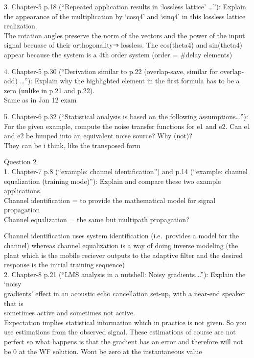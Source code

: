 \documentclass[
  a4paper,
  ,captions=tableheading
]{scrartcl}
\begin{document}
3. Chapter-5 p.18 (``Repeated application results in `lossless lattice'
\ldots''): Explain the appearance of the multiplication by `cosq4' and
`sinq4' in this lossless lattice realization.\\
The rotation angles preserve the norm of the vectors and the power of
the input signal becuase of their orthogonality⇒ lossless. The
cos(theta4) and sin(theta4) appear because the system is a 4th order
system (order = \#delay elements)

4. Chapter-5 p.30 (``Derivation similar to p.22 (overlap-save, similar
for overlap-add) \ldots''): Explain why the highlighted element in the
first formula has to be a zero (unlike in p.21 and p.22).\\
Same as in Jan 12 exam

5. Chapter-6 p.32 (``Statistical analysis is based on the following
assumptions\ldots''): For the given example, compute the noise transfer
functions for e1 and e2. Can e1 and e2 be lumped into an equivalent
noise source? Why (not)?\\
They can be i think, like the transposed form

Question 2\\
1. Chapter-7 p.8 (``example: channel identification'') and p.14
(``example: channel equalization (training mode)''): Explain and compare
these two example applications.\\
Channel identification = to provide the mathematical model for signal
propagation\\
Channel equalization = the same but multipath propagation?

Channel identification uses system identification (i.e.~provides a model
for the channel) whereas channel equalization is a way of doing inverse
modeling (the plant which is the mobile reciever outputs to the adaptive
filter and the desired response is the initial training sequence)\\
2. Chapter-8 p.21 (``LMS analysis in a nutshell: Noisy
gradients\ldots.''): Explain the `noisy\\
gradients' effect in an acoustic echo cancellation set-up, with a
near-end speaker that is\\
sometimes active and sometimes not active.\\
Expectation implies statistical information which in practice is not
given. So you use estimations from the observed signal. These
estimations of course are not perfect so what happens is that the
gradient has an error and therefore will not be 0 at the WF solution.
Wont be zero at the instantaneous value
\end{document}
